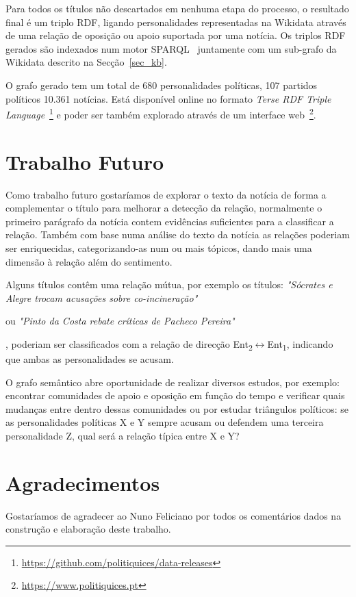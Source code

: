 \documentclass[a4paper, twocolumn, 11pt, twoside]{article}
\begin{document}
{{Para todos os títulos não descartados em nenhuma etapa do processo, o resultado final é um triplo RDF, ligando personalidades representadas na Wikidata através de uma relação de oposição ou apoio suportada por uma notícia. Os triplos RDF gerados são indexados num motor SPARQL~\citep{jena2015free} juntamente com um sub-grafo da Wikidata descrito na Secção~\ref{sec_kb}.

O grafo gerado tem um total de 680 personalidades políticas, 107 partidos políticos 10.361 notícias. Está disponível online no formato \textit{Terse RDF Triple Language}~\footnote{\url{https://github.com/politiquices/data-releases}} e poder ser também explorado através de um interface web~\footnote{\url{https://www.politiquices.pt}}.

\section{Trabalho Futuro}
\label{sec:future_work}

Como trabalho futuro gostaríamos de explorar o texto da notícia de forma a complementar o título para melhorar a detecção da relação, normalmente o primeiro parágrafo da notícia contem evidências suficientes para a classificar a relação. Também com base numa análise do texto da notícia as relações poderiam ser enriquecidas, categorizando-as num ou mais tópicos, dando mais uma dimensão à relação além do sentimento.

Alguns títulos contêm uma relação mútua, por exemplo os títulos: \textit{"Sócrates e Alegre trocam acusações sobre co-incineração"}} ou \textit{"Pinto da Costa rebate críticas de Pacheco Pereira"}}, poderiam ser classificados com a relação de direcção Ent\textsubscript{2}$\leftrightarrow$Ent\textsubscript{1}, indicando que ambas as personalidades se acusam.

O grafo semântico abre oportunidade de realizar diversos estudos, por exemplo: encontrar comunidades de apoio e oposição em função do tempo e verificar quais mudanças entre dentro dessas comunidades ou por estudar triângulos políticos: se as personalidades políticas X e Y sempre acusam ou defendem uma terceira personalidade Z, qual será a relação típica entre X e Y?

\section*{Agradecimentos}

Gostaríamos de agradecer ao Nuno Feliciano por todos os comentários dados na construção e elaboração deste trabalho. %


\end{document}
